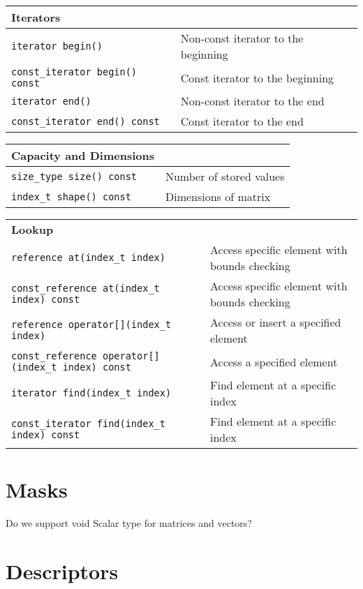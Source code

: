 \begin{tabularx}{\textwidth}{l X}
\textbf{Iterators}\\
\hline
\texttt{iterator begin()} & Non-const iterator to the beginning\\
\hline
\texttt{const\_iterator begin() const} & Const iterator to the beginning\\
\hline
\texttt{iterator end()} & Non-const iterator to the end\\
\hline
\texttt{const\_iterator end() const} & Const iterator to the end\\
\end{tabularx}

\begin{tabularx}{\textwidth}{l X}
\textbf{Capacity and Dimensions}\\
\hline
\texttt{size\_type size() const} & Number of stored values\\
\hline
\texttt{index\_t shape() const} & Dimensions of matrix\\
\end{tabularx}

\begin{tabularx}{\textwidth}{l X}
\textbf{Lookup}\\
\texttt{reference at(index\_t index)} & Access specific element with bounds checking\\
\hline
\texttt{const\_reference at(index\_t index) const} & Access specific element with bounds checking\\
\hline
\texttt{reference operator[](index\_t index)} & Access or insert a specified element\\
\hline
\texttt{const\_reference operator[](index\_t index) const} & Access a specified element\\
\hline
\texttt{iterator find(index\_t index)} & Find element at a specific index\\
\hline
\texttt{const\_iterator find(index\_t index) const} & Find element at a specific index\\
\end{tabularx}

\section{Masks}
\label{Sec:Masks}

Do we support void Scalar type for matrices and vectors?

\section{Descriptors}
\label{Sec:Descriptors}

